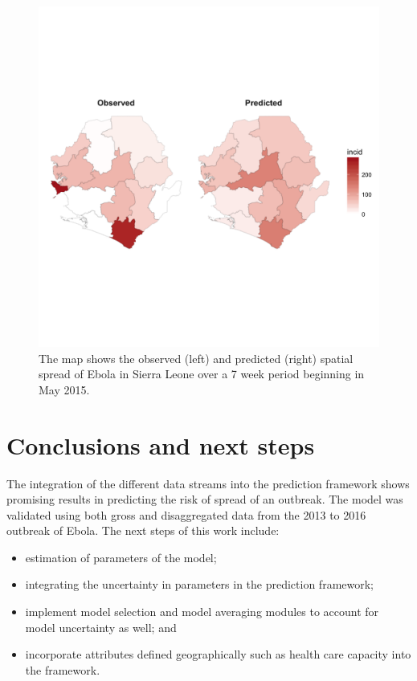 \documentclass[11pt,]{article}
\begin{document}
\begin{figure}
  \centering
  \includegraphics{ms6-figures/sl-map}
  \caption[Spatial spread of Ebola in Sierra Leone]{The map shows the
    observed (left) and predicted (right) spatial spread of Ebola in
    Sierra Leone over a 7 week period beginning in May 2015.}
  \label{fig:sl-map}
\end{figure}
\FloatBarrier

\section{Conclusions and next steps}\label{sec:conclusions}

The integration of the different data streams into the prediction
framework shows promising results in predicting the risk of spread of
an outbreak. The model was validated using both gross and
disaggregated data from the  2013 to 2016 outbreak of Ebola. The next
steps of this work include:

\begin{itemize}
\item estimation of parameters of the model;
\item integrating the uncertainty in parameters in the prediction
  framework;
\item implement model selection and model averaging modules to account
  for model uncertainty as well; and
\item incorporate attributes defined geographically such as health
  care capacity into the framework.
\end{itemize}





\newpage


\end{document}
